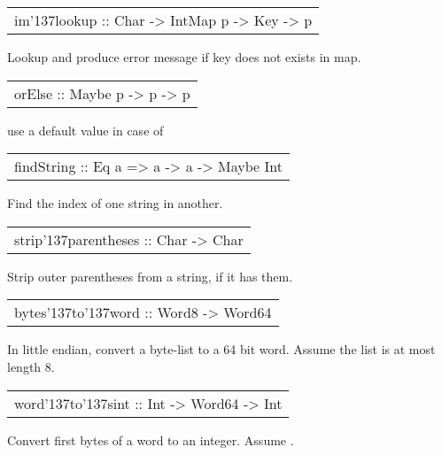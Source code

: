\begin{haddockdesc}
\item[\begin{tabular}{@{}l}
im{\char '137}lookup :: {\char 91}Char{\char 93} -> IntMap p -> Key -> p
\end{tabular}]
{\haddockbegindoc
Lookup and produce error message if key does not exists in map.\par}
\end{haddockdesc}
\begin{haddockdesc}
\item[\begin{tabular}{@{}l}
orElse :: Maybe p -> p -> p
\end{tabular}]
{\haddockbegindoc
use a default value in case of \par}
\end{haddockdesc}
\begin{haddockdesc}
\item[\begin{tabular}{@{}l}
findString :: Eq a => {\char 91}a{\char 93} -> {\char 91}a{\char 93} -> Maybe Int
\end{tabular}]
{\haddockbegindoc
Find the index of one string in another.\par}
\end{haddockdesc}
\begin{haddockdesc}
\item[\begin{tabular}{@{}l}
strip{\char '137}parentheses :: {\char 91}Char{\char 93} -> {\char 91}Char{\char 93}
\end{tabular}]
{\haddockbegindoc
Strip outer parentheses from a string, if it has them.\par}
\end{haddockdesc}
\begin{haddockdesc}
\item[\begin{tabular}{@{}l}
bytes{\char '137}to{\char '137}word :: {\char 91}Word8{\char 93} -> Word64
\end{tabular}]
{\haddockbegindoc
In little endian, convert a byte-list to a 64 bit word.
 Assume the list is at most length 8.\par}
\end{haddockdesc}
\begin{haddockdesc}
\item[\begin{tabular}{@{}l}
word{\char '137}to{\char '137}sint :: Int -> Word64 -> Int
\end{tabular}]
{\haddockbegindoc
Convert first  bytes of a word to an integer.
 Assume .\par}
\end{haddockdesc}
